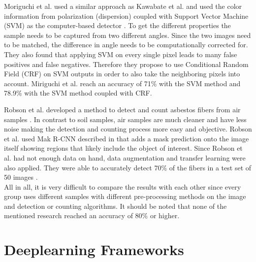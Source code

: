 Moriguchi et al. used a similar approach as Kawabate et al. and used the color information from polarization (dispersion) coupled with Support Vector Machine (SVM) as the computer-based detector \cite{moriguchi2008asbestos}. To get the different properties the sample needs to be captured from two different angles. Since the two images need to be matched, the difference in angle needs to be computationally corrected for. They also found that applying SVM on every single pixel leads to many false positives and false negatives. Therefore they propose to use Conditional Random Field (CRF) on SVM outputs in order to also take the neighboring pixels into account. Miriguchi et al. reach an accuracy of 71\% with the SVM method and 78.9\% with the SVM method coupled with CRF.

Robson et al. developed a method to detect and count asbestos fibers from air samples \cite{robson2018fiac}. In contrast to soil samples, air samples are much cleaner and have less noise making the detection and counting process more easy and objective. Robson et al. used Mak R-CNN described in \cite{he2017mask} that adds a mask prediction onto the image itself showing regions that likely include the object of interest. Since Robson et al. had not enough data on hand, data augmentation and transfer learning were also applied. They were able to accurately detect 70\% of the fibers in a test set of 50 images  \cite{robson2018fiac}. \\


All in all, it is very difficult to compare the results with each other since every group uses different samples with different pre-processing methods on the image and detection or counting algorithms. It should be noted that none of the mentioned research reached an accuracy of 80\% or higher.


\section{Deeplearning Frameworks}

